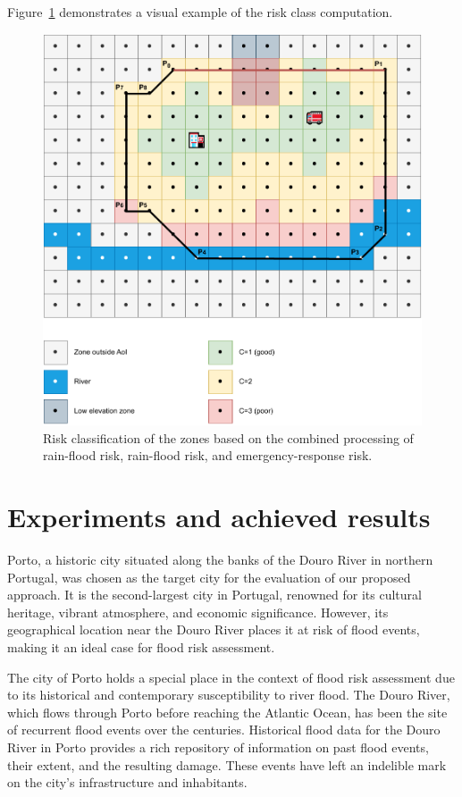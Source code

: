 \begin{refsection}
Figure~\ref{fig:zones_and_pois_classified} demonstrates a visual example of the risk class computation.

\begin{figure}[ht]
  \centering
  \includegraphics[width=0.9\linewidth]{Chapters/6-Flood/figs/zones_and_pois_classified.pdf}
  \caption{Risk classification of the zones based on the combined processing of rain-flood risk, rain-flood risk, and emergency-response risk.}\label{fig:zones_and_pois_classified}
\end{figure}

\section{Experiments and achieved results}\label{sec:simulation_ch6}

Porto, a historic city situated along the banks of the Douro River in northern Portugal, was chosen as the target city for the evaluation of our proposed approach. It is the second-largest city in Portugal, renowned for its cultural heritage, vibrant atmosphere, and economic significance. However, its geographical location near the Douro River places it at risk of flood events, making it an ideal case for flood risk assessment.

The city of Porto holds a special place in the context of flood risk assessment due to its historical and contemporary susceptibility to river flood. The Douro River, which flows through Porto before reaching the Atlantic Ocean, has been the site of recurrent flood events over the centuries. Historical flood data for the Douro River in Porto provides a rich repository of information on past flood events, their extent, and the resulting damage. These events have left an indelible mark on the city's infrastructure and inhabitants.


\end{refsection}
